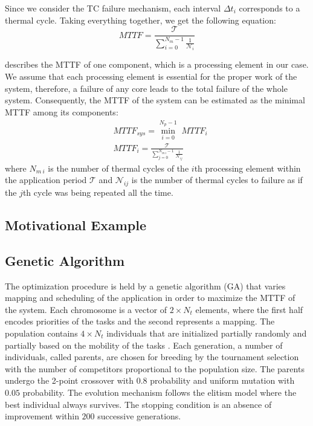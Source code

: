Since we consider the TC failure mechanism, each interval $\Delta t_i$ corresponds to a thermal cycle. Taking everything together, we get the following equation:
\begin{equation} \label{eq:one-mttf}
  MTTF = \frac{\mathcal{T}}{\sum_{i=0}^{N_m - 1} \frac{1}{\mathcal{N}_i}}
\end{equation}

 describes the MTTF of one component, which is a processing element in our case. We assume that each processing element is essential for the proper work of the system, therefore, a failure of any core leads to the total failure of the whole system. Consequently, the MTTF of the system can be estimated as the minimal MTTF among its components:
\begin{align}
  & MTTF_{sys} = \min_{i=0}^{N_p - 1} \; MTTF_i \label{eq:mttf-system} \\
  & MTTF_i = \frac{\mathcal{T}}{\sum_{j=0}^{N_{m \: i} - 1} \frac{1}{\mathcal{N}_{ij}}} \nonumber
\end{align}
where $N_{m \: i}$ is the number of thermal cycles of the $i$th processing element within the application period $\mathcal{T}$ and $\mathcal{N}_{ij}$ is the number of thermal cycles to failure as if the $j$th cycle was being repeated all the time.

\subsection{Motivational Example} \label{sec:motivation}


\subsection{Genetic Algorithm}
The optimization procedure is held by a genetic algorithm (GA) \cite{schmitz2004} that varies mapping and scheduling of the application in order to maximize the MTTF of the system. Each chromosome is a vector of $2 \times N_t$ elements, where the first half encodes priorities of the tasks and the second represents a mapping. The population contains $4 \times N_t$ individuals that are initialized partially randomly and partially based on the mobility of the tasks \cite{schmitz2004}. Each generation, a number of individuals, called parents, are chosen for breeding by the tournament selection with the number of competitors proportional to the population size. The parents undergo the 2-point crossover with $0.8$ probability and uniform mutation with $0.05$ probability. The evolution mechanism follows the elitism model where the best individual always survives. The stopping condition is an absence of improvement within $200$ successive generations.

